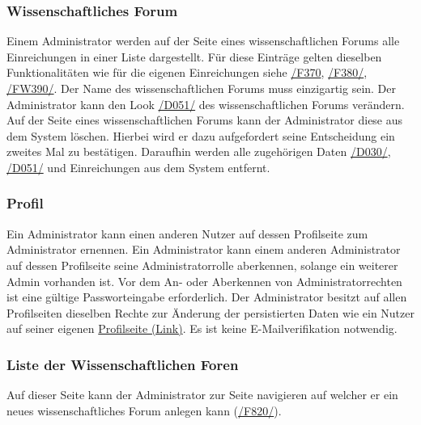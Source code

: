 \subsubsection{Wissenschaftliches Forum}
\begin{description}
     Einem Administrator werden auf der Seite eines wissenschaftlichen Forums
    alle Einreichungen in einer Liste dargestellt.
    Für diese Einträge gelten dieselben Funktionalitäten wie für die
    eigenen Einreichungen siehe \hyperref[funkt:370]{/F370}, \hyperref[funkt:380]{/F380/}, \hyperref[funkt:390]{/FW390/}.
    Der Name des wissenschaftlichen Forums muss einzigartig sein.
     Der Administrator kann den Look \hyperref[d051]{/D051/}
    des wissenschaftlichen Forums verändern.
     Auf der Seite eines wissenschaftlichen Forums kann der Administrator diese aus dem System löschen.
    Hierbei wird er dazu aufgefordert seine Entscheidung ein zweites Mal zu bestätigen.
    Daraufhin werden alle zugehörigen Daten \hyperref[d030]{/D030/}, \hyperref[d051]{/D051/}
    und Einreichungen aus dem System entfernt.
\end{description}

\subsubsection{Profil}
\begin{description}
     Ein Administrator kann einen anderen Nutzer auf dessen Profilseite zum Administrator ernennen.
     Ein Administrator kann einem anderen Administrator auf dessen Profilseite seine
    Administratorrolle aberkennen, solange ein weiterer Admin vorhanden ist.
     Vor dem An- oder Aberkennen von Administratorrechten ist eine gültige
    Passworteingabe erforderlich.
     Der Administrator besitzt auf allen Profilseiten dieselben Rechte zur Änderung
    der persistierten Daten wie ein Nutzer auf seiner eigenen
    \hyperref[nut:profil]{Profilseite (Link)}. Es ist keine E-Mailverifikation notwendig.
\end{description}

\subsubsection{Liste der Wissenschaftlichen Foren}
\begin{description}
     Auf dieser Seite kann der Administrator zur Seite navigieren auf welcher er ein neues
    wissenschaftliches Forum anlegen kann (\hyperref[funkt:820]{/F820/}).
\end{description}

